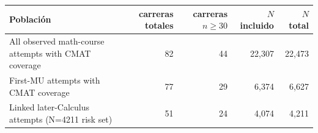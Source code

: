 \begin{tabular}{p{7cm}rrrr}
\toprule
Población & carreras totales & carreras $n\ge30$ & $N$ incluido & $N$ total \\
\midrule
All observed math-course attempts with CMAT coverage & 82 & 44 & 22,307 & 22,473 \\
First-MU attempts with CMAT coverage & 77 & 29 & 6,374 & 6,627 \\
Linked later-Calculus attempts (N=4211 risk set) & 51 & 24 & 4,074 & 4,211 \\
\bottomrule
\end{tabular}
